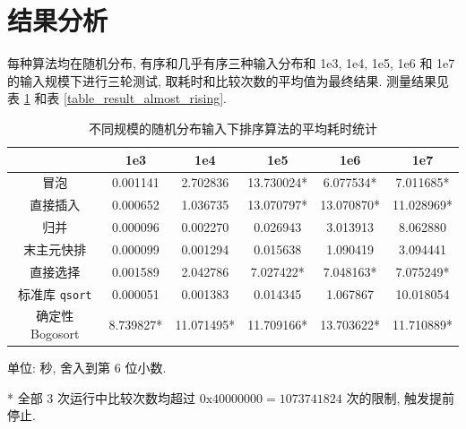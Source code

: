 \documentclass[12pt]{article}
\begin{document}
\section{结果分析}

每种算法均在随机分布, 有序和几乎有序三种输入分布和 1e3, 1e4, 1e5, 1e6 和 1e7 的输入规模下进行三轮测试, 取耗时和比较次数的平均值为最终结果. 测量结果见表 \ref{table_result_random} 和表 \ref{table_result_almost_rising}.

\begin{table}
\centering
\begin{threeparttable}
    \caption{不同规模的随机分布输入下排序算法的平均耗时统计}
    \begin{tabular}{cccccc}
        \toprule
         & 1e3 & 1e4 & 1e5 & 1e6 & 1e7 \\
        \midrule
        冒泡 & 0.001141 & 2.702836 & 13.730024* & 6.077534* & 7.011685* \\
        直接插入 & 0.000652 & 1.036735 & 13.070797* & 13.070870* & 11.028969* \\
        归并 & 0.000096 & 0.002270 & 0.026943 & 3.013913 & 8.062880 \\
        末主元快排 & 0.000099 & 0.001294 & 0.015638 & 1.090419 & 3.094441 \\
        直接选择 & 0.001589 & 2.042786 & 7.027422* & 7.048163* & 7.075249* \\
        标准库 \texttt{qsort} & 0.000051 & 0.001383 & 0.014345 & 1.067867 & 10.018054 \\
        确定性 Bogosort & 8.739827* & 11.071495* & 11.709166* & 13.703622* & 11.710889* \\
        \bottomrule
    \end{tabular}
    \begin{tablenotes}
        \small
        \item 单位: 秒, 舍入到第 6 位小数.
        \item[*] 全部 3 次运行中比较次数均超过 $0\mathrm{x}40000000 = 1073741824$ 次的限制, 触发提前停止.
    \end{tablenotes}
    \label{table_result_random}
\end{threeparttable}
\end{table}
\end{document}
